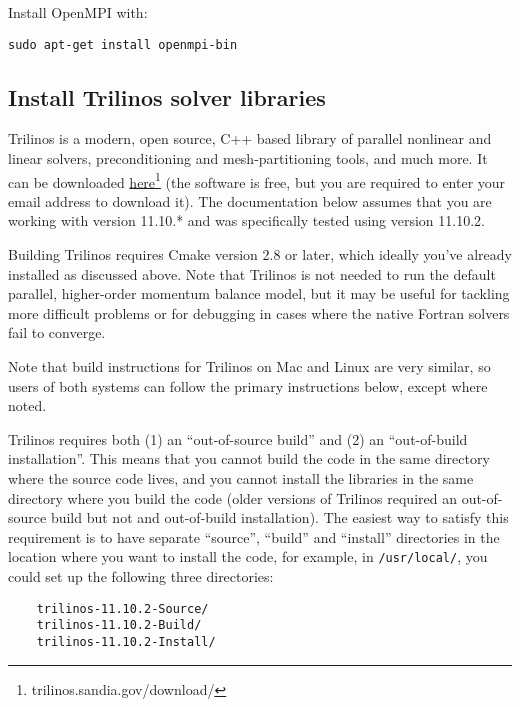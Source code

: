 \begin{mdframed}[style=ubuntu] %
Install OpenMPI with:

\texttt{sudo apt-get install openmpi-bin}
\end{mdframed}                 %



\subsection{Install Trilinos solver libraries}

Trilinos is a modern, open source, C++ based library of parallel nonlinear and linear solvers, 
preconditioning and mesh-partitioning tools, and much more. It can be downloaded 
\href{trilinos.sandia.gov/download/}{here}\footnote{trilinos.sandia.gov/download/}
 (the software is free, but you are required to enter your email address to download it). 
The documentation below assumes that you are working with version 11.10.* and was specifically 
tested using version 11.10.2. 

Building Trilinos requires Cmake version 2.8 or later, which ideally you've already 
installed as discussed above. Note that Trilinos is not needed to run the default 
parallel, higher-order momentum balance model, but it may be useful for tackling 
more difficult problems or for debugging in cases where the native Fortran solvers 
fail to converge.

Note that build instructions for Trilinos on Mac and Linux are very similar, so users
of both systems can follow the primary instructions below, except where noted.

Trilinos requires both (1) an ``out-of-source build'' and (2) an ``out-of-build installation''. 
This means that you cannot build the code in the same directory where the source code lives, 
and you cannot install the libraries in the same directory where you build the code 
(older versions of Trilinos required an out-of-source build but not and out-of-build installation). 
The easiest way to satisfy this requirement is to have separate ``source'', ``build'' and 
``install'' directories in the location where you want to install the code, 
for example, in \texttt{/usr/local/}, you could set up the following three directories:

\begin{verbatim}
	trilinos-11.10.2-Source/
	trilinos-11.10.2-Build/
	trilinos-11.10.2-Install/
\end{verbatim}

